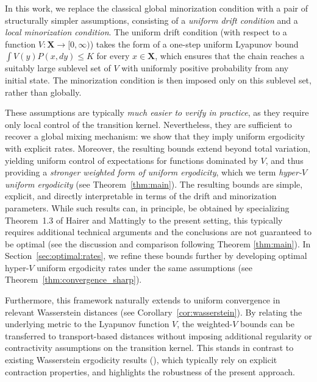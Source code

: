 \documentclass[ejsv2, noshowframe]{imsart}
\theoremstyle{plain}
\theoremstyle{definition}
\theoremstyle{remark}
\newcommand{\X}{\textbf{X}}
\begin{document}
In this work, we replace the classical global minorization condition with a pair of structurally simpler assumptions, consisting of a \emph{uniform drift condition} and a \emph{local minorization condition}. The uniform drift condition (with respect to a function $V: \X \rightarrow [0, \infty)$) takes the form of a one-step uniform Lyapunov bound $\int V(y) P(x, dy) \le K$ for every $x \in \X$, which ensures that the chain reaches a suitably large sublevel set of $V$ with uniformly positive probability from any initial state. The minorization condition is then imposed only on this sublevel set, rather than globally.

These assumptions are typically {\em much easier to verify in practice}, as they require only local control of the transition kernel. Nevertheless, they are sufficient to recover a global mixing mechanism: we show that they imply uniform ergodicity with explicit rates. Moreover, the resulting bounds extend beyond total variation, yielding uniform control of expectations for functions dominated by $V$, and thus providing a \emph{stronger weighted form of uniform ergodicity}, which we term \emph{hyper-$V$ uniform ergodicity} (see Theorem~\ref{thm:main}). The resulting bounds are simple, explicit, and directly interpretable in terms of the drift and minorization parameters. 
While such results can, in principle, be obtained by specializing Theorem~1.3 of Hairer and Mattingly \citep{hairer:mattingly:2011} to the present setting, this typically requires additional technical arguments and the conclusions are not guaranteed to be optimal (see the discussion and comparison following Theorem \ref{thm:main}). In Section~\ref{sec:optimal:rates}, we refine these bounds further by developing optimal hyper-$V$ uniform ergodicity rates under the same assumptions (see Theorem~\ref{thm:convergence_sharp}). 

Furthermore, this framework naturally extends to uniform convergence in relevant Wasserstein distances (see Corollary~\ref{cor:wasserstein}). By relating the underlying metric to the Lyapunov function $V$, the weighted-$V$ bounds can be transferred to transport-based distances without imposing additional regularity or contractivity assumptions on the transition kernel. This stands in contrast to existing Wasserstein ergodicity results (\cite{hairer:mattingly:2011, HairerMattinglyScheutzow2011, Eberle2016}), which typically rely on explicit contraction properties, and highlights the robustness of the present approach. 
\end{document}
